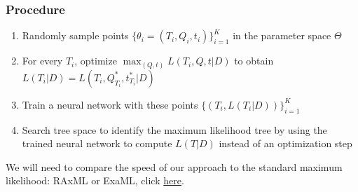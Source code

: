 \documentclass[]{article}
\providecommand{\tightlist}{%
  \setlength{\itemsep}{0pt}\setlength{\parskip}{0pt}}
\begin{document}
\hypertarget{procedure}{%
\subsubsection{Procedure}\label{procedure}}

\begin{enumerate}
\def\labelenumi{\arabic{enumi}.}
\tightlist
\item
  Randomly sample points \(\{\theta_i = (T_i,Q_i,t_i)\}_{i=1}^K\) in the
  parameter space \(\Theta\)
\item
  For every \(T_i\), optimize \(\max_{(Q,t)} L(T_i,Q,t|D)\) to obtain
  \(L(T_i|D) = L(T_i,Q^*_{T_i},t^*_{T_i}|D)\)
\item
  Train a neural network with these points
  \(\{(T_i, L(T_i|D))\}_{i=1}^K\)
\item
  Search tree space to identify the maximum likelihood tree by using the
  trained neural network to compute \(L(T|D)\) instead of an
  optimization step
\end{enumerate}

We will need to compare the speed of our approach to the standard
maximum likelihood: RAxML or ExaML, click
\href{https://cme.h-its.org/exelixis/software.html}{here}.


\end{document}
